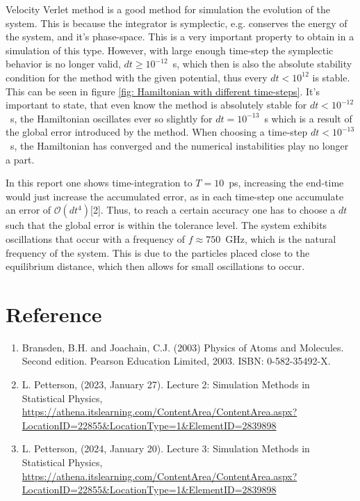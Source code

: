 \documentclass[a4paper]{article}
\newcommand{\newparagraph}{\vspace{.5cm}\noindent}
\begin{document}
\newparagraph
Velocity Verlet method is a good method for simulation the evolution of the system. This is because the integrator is symplectic, e.g. conserves the energy of the system, and it's phase-space.
This is a very important property to obtain in a simulation of this type. However, with large enough time-step the symplectic behavior is no longer valid, $dt\geq10^{-12}$~s, which then is also the absolute stability condition for the method with the given potential, thus every $dt< 10^{12}$ is stable. This can be seen in figure \ref{fig: Hamiltonian with different time-steps}.
It's important to state, that even know the method is absolutely stable for $dt<10^{-12}$~s, the Hamiltonian oscillates ever so slightly for $dt = 10^{-13}$~s which is a result of the global error introduced by the method. When choosing a time-step $dt <10^{-13}$~s, the Hamiltonian has converged and the numerical instabilities play no longer a part.

\newparagraph
In this report one shows time-integration to $T = 10$~ps, increasing the end-time would just increase the accumulated error, as in each time-step one accumulate an error of $\mathcal{O}(dt^4)$[2].
Thus, to reach a certain accuracy one has to choose a $dt$ such that the global error is within the tolerance level. The system exhibits oscillations that occur with a frequency of $f \approx 750$~GHz, which is the natural frequency of the system. This is due to the particles placed close to the equilibrium distance, which then allows for small oscillations to occur.

\newpage
\section{Reference}

\begin{enumerate}
    \item Bransden, B.H. and Joachain, C.J. (2003) Physics of Atoms and Molecules. Second edition. Pearson Education Limited, 2003. ISBN: 0-582-35492-X.
    \item L. Petterson, (2023, January 27). Lecture 2: Simulation Methods in Statistical Physics, \url{https://athena.itslearning.com/ContentArea/ContentArea.aspx?LocationID=22855&LocationType=1&ElementID=2839898}
    \item L. Petterson, (2024, January 20). Lecture 3: Simulation Methods in Statistical Physics, \url{https://athena.itslearning.com/ContentArea/ContentArea.aspx?LocationID=22855&LocationType=1&ElementID=2839898}
\end{enumerate}
\end{document}
